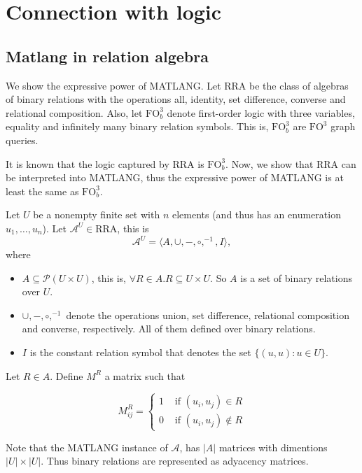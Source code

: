 \section{Connection with logic}

\subsection{Matlang in relation algebra}

We show the expressive power of MATLANG. Let RRA be the class of algebras of binary relations with the operations all, identity, set difference, converse and relational composition. Also, let $\text{FO}^3_b$ denote first-order logic with three variables, equality and infinitely many binary relation symbols. This is, $\text{FO}^3_b$ are $\text{FO}^3$ graph queries.

It is known that the logic captured by RRA is $\text{FO}^3_b$. Now, we show that RRA can be interpreted into MATLANG, thus the expressive power of MATLANG is at least the same as $\text{FO}^3_b$.

Let $U$ be a nonempty finite set with $n$ elements (and thus has an enumeration $u_1,\ldots, u_n$). Let $\mathcal{A}^U\in\text{RRA}$, this is $$\mathcal{A}^U=\langle A, \cup, -, \circ, ^{-1}, I\rangle,$$ where 

\begin{itemize}
	\item $A\subseteq\mathcal{P}(U\times U)$, this is, $\forall R\in A. R\subseteq U\times U$. So $A$ is a set of binary relations over $U$.
	\item $\cup, -, \circ, ^{-1}$ denote the operations union, set difference, relational composition and converse, respectively. All of them defined over binary relations.
	\item $I$ is the constant relation symbol that denotes the set $\lbrace (u,u):u\in U\rbrace$.
\end{itemize}

Let $R\in A$. Define $M^R$ a matrix such that

\[ M^R_{ij}=
    \begin{cases} 
      1 & \text{ if }(u_i, u_j)\in R \\
      0 & \text{ if }(u_i, u_j)\notin R 
   \end{cases}
\]

Note that the MATLANG instance of $\mathcal{A}$, has $|A|$ matrices with dimentions $|U|\times |U|$. Thus binary relations are represented as adyacency matrices.

